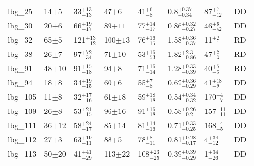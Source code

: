 \documentclass[fleqn,usenatbib]{mnras}
\begin{document}
\begin{table*}
\begin{threeparttable}
\begin{tabular}{llllllll}
lbg\_25         & 14$\pm5$                    & 33$^{+13}_{-13}$                     & 47$\pm6$                  & 41$^{+6}_{-8}$         & 0.8$^{+0.37}_{-0.34}$                  & 87$^{+7}_{-12}$  & DD   \\[1ex]
lbg\_30         & 20$\pm6$                    & 66$^{+19}_{-17}$                    & 89$\pm11$                 & 77$^{+14}_{-17}$       & 0.86$^{+0.32}_{-0.27}$               & 46$^{+6}_{-42}$ & DD \\[1ex]
lbg\_32         & 65$\pm5$                    & 121$^{+13}_{-12}$                    & 100$\pm13$                 & 76$^{+16}_{-15}$       & 1.58$^{+0.36}_{-0.37}$               & 11$^{+2}_{-1}$ & RD \\[1ex]
lbg\_38         & 26$\pm7$                    & 97$^{+72}_{-34}$                     & 71$\pm10$                  & 53$^{+16}_{-53}$       & 1.82$^{+2.3}_{-0.86}$               & 47$^{+2}_{-3}$  & RD   \\[1ex]
lbg\_91         & 48$\pm10$                    & 91$^{+15}_{-18}$                     & 94$\pm8$                  & 71$^{+16}_{-14}$        & 1.28$^{+0.33}_{-0.39}$              & 40$^{+5}_{-3}$  & RD  \\[1ex]
lbg\_94         & 18$\pm8$                    & 34$^{+19}_{-15}$                     & 60$\pm6$                  & 55$^{+7}_{-8}$         & 0.62$^{+0.36}_{-0.29}$                & 41$^{+18}_{-9}$  & DD  \\[1ex]
lbg\_105        & 11$\pm8$                    & 32$^{+17}_{-16}$                     & 61$\pm18$                  & 59$^{+18}_{-18}$        & 0.54$^{+0.34}_{-0.32}$                & 170$^{+4}_{-7}$ & DD  \\[1ex]
lbg\_109        & 26$\pm8$                    & 53$^{+21}_{-15}$                     & 96$\pm16$                 & 91$^{+16}_{-18}$      & 0.58$^{+0.26}_{-0.2}$                & 157$^{+11}_{-11}$ & DD  \\[1ex]
lbg\_111        & 36$\pm12$         & 58$^{+24}_{-17}$                     & 85$\pm14$                  & 81$^{+14}_{-16}$                   & 0.71$^{+0.33}_{-0.25}$                 & 168$^{+4}_{-5}$ & DD  \\[1ex]
lbg\_112         & 27$\pm3$                    & 63$^{+19}_{-11}$                    & 88$\pm5$                 & 78$^{+8}_{-11}$       & 0.81$^{+0.28}_{-0.17}$               & 4$^{+34}_{-12}$ & DD \\[1ex]
lbg\_113        & 50$\pm20$           & 41$^{+41}_{-29}$                     & 113$\pm22$                 & 108$^{+23}_{-25}$                  & 0.39$^{+0.39}_{-0.29}$                & 1$^{+34}_{-26}$  & DD   \\[1ex]

\end{tabular}
\end{threeparttable}
\end{table*}
\end{document}
